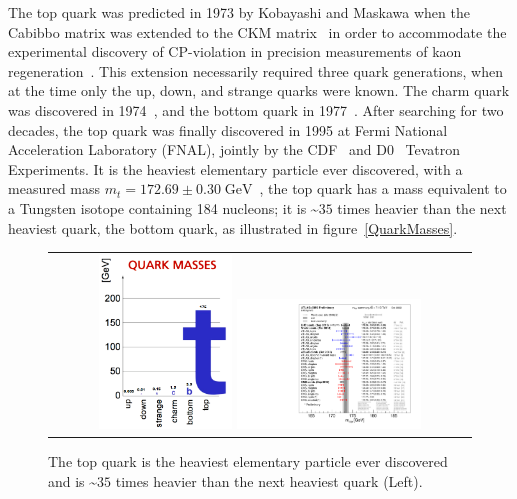 \begin{refsection}
The top quark was predicted in 1973 by Kobayashi and Maskawa when the Cabibbo matrix was extended to the CKM matrix~\cite{10.1143/PTP.49.652} in order to accommodate the experimental discovery of CP-violation in precision measurements of kaon regeneration~\cite{PhysRevLett.13.138}.
This extension necessarily required three quark generations, when at the time only the up, down, and strange quarks were known.
The charm quark was discovered in 1974~\cite{PhysRevLett.33.1404},\cite{PhysRevLett.33.1406} and the bottom quark in 1977~\cite{PhysRevLett.39.252}.
After searching for two decades, the top quark was finally discovered in 1995 at Fermi National Acceleration Laboratory (FNAL), jointly by the CDF~\cite{PhysRevLett.74.2626} and D0~\cite{PhysRevLett.74.2632} Tevatron Experiments.
It is the heaviest elementary particle ever discovered, with a measured mass $m_t = 172.69 \pm 0.30 \; \si{\GeV}$~\cite{bib:PDG}, the top quark has a mass equivalent to a Tungsten isotope containing 184 nucleons; it is \sim$35$ times heavier than the next heaviest quark, the bottom quark, as illustrated in figure~\ref{QuarkMasses}.
\begin{figure}[htb]
  \begin{center}
    \begin{tabular}{c}
        \includegraphics[width=0.325\textwidth]{fig_TopQuark/TopQuarkMass.png}
        \includegraphics[width=0.45\textwidth]{fig_TopQuark/LHC_topmass_oct22.pdf}
    \end{tabular}
    \caption{The top quark is the heaviest elementary particle ever discovered and is \sim$35$ times heavier than the next heaviest quark (Left).
}
\end{center}
\end{figure}
\end{refsection}
